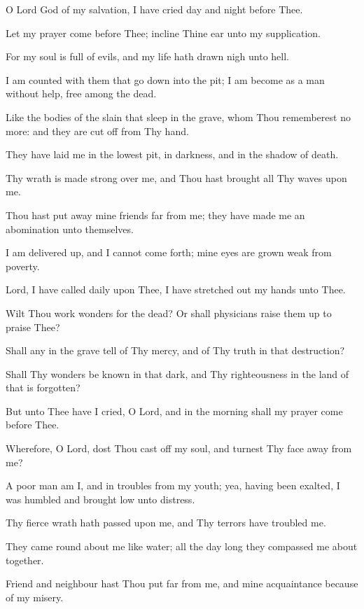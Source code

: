 O Lord God of my salvation, I have cried day and night before Thee.

Let my prayer come before Thee; incline Thine ear unto my supplication.

For my soul is full of evils, and my life hath drawn nigh unto hell.

I am counted with them that go down into the pit; I am become as a man without help, free among the dead.

Like the bodies of the slain that sleep in the grave, whom Thou rememberest no more: and they are cut off from Thy hand.

They have laid me in the lowest pit, in darkness, and in the shadow of death.

Thy wrath is made strong over me, and Thou hast brought all Thy waves upon me.

Thou hast put away mine friends far from me; they have made me an abomination unto themselves.

I am delivered up, and I cannot come forth; mine eyes are grown weak from poverty.

Lord, I have called daily upon Thee, I have stretched out my hands unto Thee.

Wilt Thou work wonders for the dead? Or shall physicians raise them up to praise Thee?

Shall any in the grave tell of Thy mercy, and of Thy truth in that destruction?

Shall Thy wonders be known in that dark, and Thy righteousness in the land of that is forgotten?

But unto Thee have I cried, O Lord, and in the morning shall my prayer come before Thee.

Wherefore, O Lord, dost Thou cast off my soul, and turnest Thy face away from me?

A poor man am I, and in troubles from my youth; yea, having been exalted, I was humbled and brought low unto distress.

Thy fierce wrath hath passed upon me, and Thy terrors have troubled me.

They came round about me like water; all the day long they compassed me about together.

Friend and neighbour hast Thou put far from me, and mine acquaintance because of my misery.

